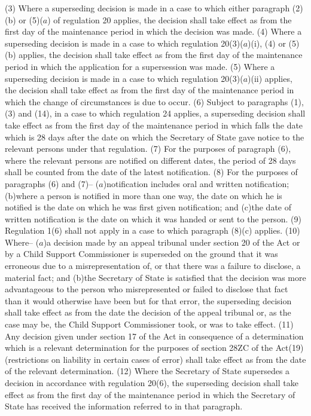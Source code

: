 \documentclass[12pt,a4paper]{article}
\begin{document}
(3) Where a superseding decision is made in a case to which either paragraph (2)(b) or (5)($a$) of regulation 20 applies, the decision shall take effect as from the first day of the maintenance period in which the decision was made.
(4) Where a superseding decision is made in a case to which regulation 20(3)($a$)(i), (4) or (5)(b) applies, the decision shall take effect as from the first day of the maintenance period in which the application for a supersession was made.
(5) Where a superseding decision is made in a case to which regulation 20(3)($a$)(ii) applies, the decision shall take effect as from the first day of the maintenance period in which the change of circumstances is due to occur.
(6) Subject to paragraphs (1), (3) and (14), in a case to which regulation 24 applies, a superseding decision shall take effect as from the first day of the maintenance period in which falls the date which is 28 days after the date on which the Secretary of State gave notice to the relevant persons under that regulation.
(7) For the purposes of paragraph (6), where the relevant persons are notified on different dates, the period of 28 days shall be counted from the date of the latest notification.
(8) For the purposes of paragraphs (6) and (7)–
($a$)notification includes oral and written notification;
(b)where a person is notified in more than one way, the date on which he is notified is the date on which he was first given notification; and
(c)the date of written notification is the date on which it was handed or sent to the person.
(9) Regulation 1(6) shall not apply in a case to which paragraph (8)(c) applies.
(10) Where–
($a$)a decision made by an appeal tribunal under section 20 of the Act or by a Child Support Commissioner is superseded on the ground that it was erroneous due to a misrepresentation of, or that there was a failure to disclose, a material fact; and
(b)the Secretary of State is satisfied that the decision was more advantageous to the person who misrepresented or failed to disclose that fact than it would otherwise have been but for that error,
the superseding decision shall take effect as from the date the decision of the appeal tribunal or, as the case may be, the Child Support Commissioner took, or was to take effect.
(11) Any decision given under section 17 of the Act in consequence of a determination which is a relevant determination for the purposes of section 28ZC of the Act(19) (restrictions on liability in certain cases of error) shall take effect as from the date of the relevant determination.
(12) Where the Secretary of State supersedes a decision in accordance with regulation 20(6), the superseding decision shall take effect as from the first day of the maintenance period in which the Secretary of State has received the information referred to in that paragraph.
\end{document}
